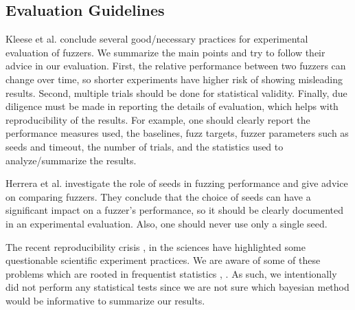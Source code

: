 \subsection{Evaluation Guidelines}
Kleese et al. \cite{Klees.2018} conclude several good/necessary practices for experimental evaluation of fuzzers.
%
We summarize the main points and try to follow their advice in our evaluation.
%
First, the relative performance between two fuzzers can change over time, so shorter experiments have higher risk of showing misleading results.
%
Second, multiple trials should be done for statistical validity.
%
Finally, due diligence must be made in reporting the details of evaluation, which helps with reproducibility of the results.
%
For example, one should clearly report the performance measures used, the baselines, fuzz targets, fuzzer parameters such as seeds and timeout, the number of trials, and the statistics used to analyze/summarize the results.


Herrera et al. \cite{Herrera.2021} investigate the role of seeds in fuzzing performance and give advice on comparing fuzzers.
%
They conclude that the choice of seeds can have a significant impact on a fuzzer's performance, so it should be clearly documented in an experimental evaluation.
%
Also, one should never use only a single seed.


The recent reproducibility crisis \cite{Baker.2016}, \cite{Oza.2023} in the sciences have highlighted some questionable scientific experiment practices.
%
We are aware of some of these problems which are rooted in frequentist statistics \cite{Jaynes.2003}, \cite{Clayton.2021}.
%
As such, we intentionally did not perform any statistical tests since we are not sure which bayesian method would be informative to summarize our results.